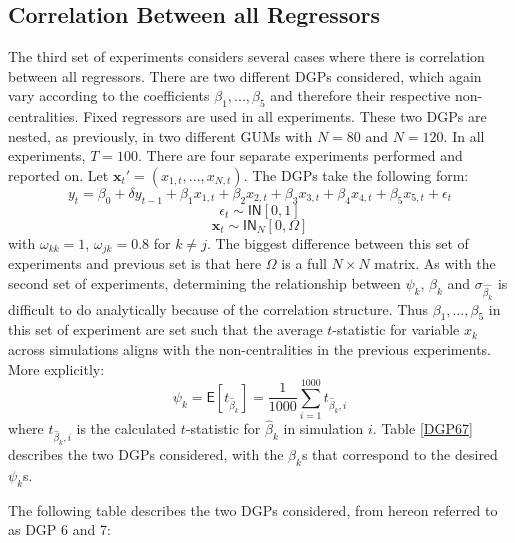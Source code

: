 \subsection{Correlation Between all Regressors}


The third set of experiments considers several cases where there is correlation between all regressors. There are two different DGPs considered, which again vary according to the coefficients $\beta_{1},...,\beta_{5}$ and therefore their respective non-centralities. Fixed regressors are used in all experiments. These two DGPs are nested, as previously, in two different GUMs with $N=80$ and $N=120$. In all experiments, $T=100$. There are four separate experiments performed and reported on. Let $\textbf{x}_{t}'=(x_{1,t},...,x_{N,t})$. The DGPs take the following form: 
$$y_{t}=\beta_{0} + \delta y_{t-1}+\beta_{1}x_{1,t}+\beta_{2}x_{2,t}+ \beta_{3}x_{3,t}+ \beta_{4}x_{4,t}+ \beta_{5}x_{5,t} + \epsilon_{t}$$
$$\epsilon_{t} \sim \mathsf{IN}[0,1] $$
 $$\textbf{x}_{t} \sim \mathsf{IN}_{N}[0,\Omega]$$
with $\omega_{kk} = 1 $, $\omega_{jk} = 0.8 $ for $k \neq j $. The biggest difference between this set of experiments and previous set is that here $\Omega$ is a full $N \times N$ matrix. As with the second set of experiments,  determining the relationship between $\psi_{k}$, $\beta_{k}$ and $\sigma_{\hat{\beta_{k}}}$ is difficult to do analytically because of the correlation structure. Thus $\beta_{1},...,\beta_{5}$ in this set of experiment are set such that the average $t$-statistic for variable $x_{k}$ across simulations aligns with the non-centralities in the previous experiments. More explicitly:
$$\psi_{k} = \mathsf{E}[t_{\widehat{\beta}_{k}}] = \frac{1}{1000}\sum_{i=1}^{1000}t_{\widehat{\beta}_{k},i}$$
where $t_{\widehat{\beta}_{k},i}$ is the calculated $t$-statistic for $\widehat{\beta}_{k}$ in simulation $i$. Table \ref{DGP67} describes the two DGPs considered, with the $\beta_{k}$s that correspond to the desired $\psi_{k}$s. 



The following table describes the two DGPs considered, from hereon referred to as DGP 6 and 7:


